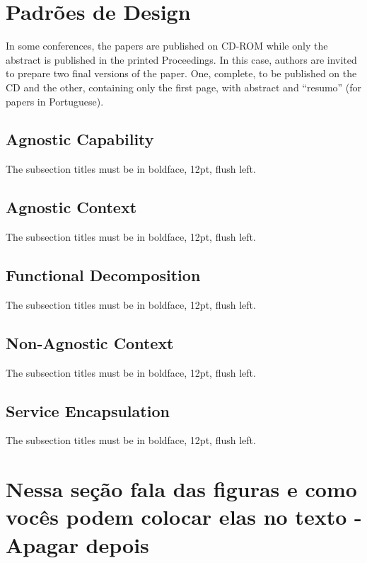 \documentclass[12pt]{article}
\begin{document}
\section{Padrões de Design}

In some conferences, the papers are published on CD-ROM while only the
abstract is published in the printed Proceedings. In this case, authors are
invited to prepare two final versions of the paper. One, complete, to be
published on the CD and the other, containing only the first page, with
abstract and ``resumo'' (for papers in Portuguese).

\subsection{Agnostic Capability}

The subsection titles must be in boldface, 12pt, flush left.

\subsection{Agnostic Context}

The subsection titles must be in boldface, 12pt, flush left.

\subsection{Functional Decomposition}

The subsection titles must be in boldface, 12pt, flush left.

\subsection{Non-Agnostic Context}

The subsection titles must be in boldface, 12pt, flush left.

\subsection{Service Encapsulation}

The subsection titles must be in boldface, 12pt, flush left.


\section{Nessa seção fala das figuras e como vocês podem colocar elas no texto - Apagar depois}\label{sec:figs}
\end{document}
